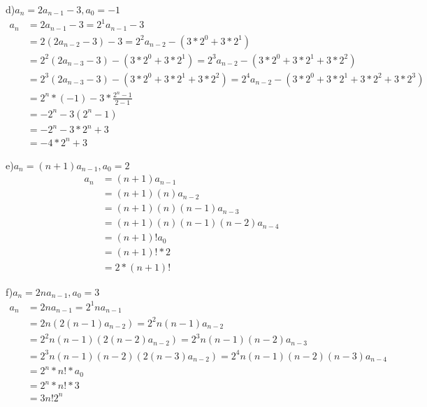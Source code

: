 \documentclass[12pt]{article}
\begin{document}
d)$a_{n}=2a_{n-1}-3,a_0=-1$\\
\begin{equation}\nonumber
    \begin{split}
        a_n&=2a_{n-1}-3=2^1a_{n-1}-3\\
        &=2(2a_{n-2}-3)-3=2^2a_{n-2}-(3*2^0+3*2^1)\\
        &=2^2(2a_{n-3}-3)-(3*2^0+3*2^1)=2^3a_{n-2}-(3*2^0+3*2^1+3*2^2)\\
        &=2^3(2a_{n-3}-3)-(3*2^0+3*2^1+3*2^2)=2^4a_{n-2}-(3*2^0+3*2^1+3*2^2+3*2^3)\\
        &=2^n*(-1)-3*\frac{2^n-1}{2-1}\\
        &=-2^n-3(2^n-1)\\
        &=-2^n-3*2^n+3\\
        &=-4*2^n+3
    \end{split}
\end{equation}

e)$a_{n}=(n+1)a_{n-1},a_0=2$\\
\begin{equation}\nonumber
    \begin{split}
        a_n&=(n+1)a_{n-1}\\
        &=(n+1)(n)a_{n-2}\\
        &=(n+1)(n)(n-1)a_{n-3}\\
        &=(n+1)(n)(n-1)(n-2)a_{n-4}\\
        &=(n+1)!a_0\\
        &=(n+1)!*2\\
        &=2*(n+1)!
    \end{split}
\end{equation}


f)$a_{n}=2na_{n-1},a_0=3$\\
\begin{equation}\nonumber
    \begin{split}
        a_n&=2na_{n-1}=2^1na_{n-1}\\
        &=2n(2(n-1)a_{n-2})=2^2n(n-1)a_{n-2}\\
        &=2^2n(n-1)(2(n-2)a_{n-2})=2^3n(n-1)(n-2)a_{n-3}\\
        &=2^3n(n-1)(n-2)(2(n-3)a_{n-2})=2^4n(n-1)(n-2)(n-3)a_{n-4}\\
        &=2^n*n!*a_0\\
        &=2^n*n!*3\\
        &=3n!2^n
    \end{split}
\end{equation}
\end{document}
